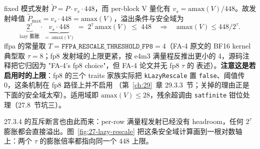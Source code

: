 fixed 模式发射 $\tilde{P} = P \cdot v_s \cdot 448$，而 per-block V
量化有 $v_s = \mathrm{amax}(V)/448$。故发射峰值
$\tilde{P}_{\max} = v_s \cdot 448 = \mathrm{amax}(V)$，溢出条件与安全域为
\begin{equation}
  \underbrace{2^{\tau}}_{\text{lazy 膨胀}} \cdot
  \underbrace{v_s \cdot 448}_{=\ \mathrm{amax}(V)}
  \;=\; 2^{\tau}\,\mathrm{amax}(V)
  \;\le\; 448
  \quad\Longrightarrow\quad
  \mathrm{amax}(V) \le 448/2^{\tau}.
  \label{eq:27-overflow}
\end{equation}
ffpa 的常量取 $T = \texttt{FFPA\_RESCALE\_THRESHOLD\_FP8} = 4$（FA-4 原文的 BF16
kernel 典型取 $\tau = 8$；fp8 发射域的上限更紧，按 e4m3 满量程反推出更小的
4，源码注释把它归因为 "FA-4's fp8 choice"，但 FA-4 论文并无 fp8 $\tau$ 的
表述）。\textbf{注意这是\textbf{若启用}时的上限}：fp8 的三个 traits 家族实际把
\texttt{kLazyRescale} 置 \texttt{false}、阈值传 0，这条机制在 fp8 路径上并不启用
（第~\ref{ch:29}~章 29.3.3~节；关掉的理由正是下面的安全域太窄）。适用域即
$\mathrm{amax}(V) \le 28$，残余超调由 \texttt{satfinite} 钳位处理（27.8~节坑三）。

27.3.4 的互斥断言也由此而来：per-row 满量程发射已经没有 headroom，任何 $2^{\tau}$
膨胀都会直接溢出。图~\ref{fig:27-lazy-rescale}
把这条安全域计算画到一根对数轴上：两个 $\tau$ 的膨胀倍率都指向同一个 448 上限。

